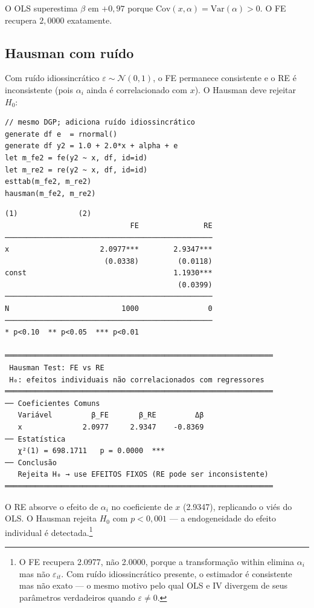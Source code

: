 O OLS superestima $\beta$ em $+0{,}97$ porque $\mathrm{Cov}(x,\alpha) =
\mathrm{Var}(\alpha) > 0$. O FE recupera $2{,}0000$ exatamente.

\subsection*{Hausman com ruído}

Com ruído idiossincrático $\varepsilon \sim \mathcal{N}(0,1)$, o FE permanece
consistente e o RE é inconsistente (pois $\alpha_i$ ainda é correlacionado
com $x$). O Hausman deve rejeitar $H_0$:

\begin{lstlisting}[caption={Hausman — FE vs RE com efeito correlacionado}]
// mesmo DGP; adiciona ruído idiossincrático
generate df e  = rnormal()
generate df y2 = 1.0 + 2.0*x + alpha + e
let m_fe2 = fe(y2 ~ x, df, id=id)
let m_re2 = re(y2 ~ x, df, id=id)
esttab(m_fe2, m_re2)
hausman(m_fe2, m_re2)
\end{lstlisting}

\begin{lstlisting}[language={}, basicstyle=\ttfamily\small,
  frame=none, numbers=none, backgroundcolor=\color{codbg},
  xleftmargin=0pt, xrightmargin=0pt, breaklines=false]
                            (1)              (2)
                             FE               RE
────────────────────────────────────────────────
x                     2.0977***        2.9347***
                       (0.0338)         (0.0118)
const                                  1.1930***
                                        (0.0399)
────────────────────────────────────────────────
N                          1000                0
────────────────────────────────────────────────
* p<0.10  ** p<0.05  *** p<0.01

══════════════════════════════════════════════════════════════
 Hausman Test: FE vs RE
 H₀: efeitos individuais não correlacionados com regressores
══════════════════════════════════════════════════════════════
── Coeficientes Comuns
   Variável         β_FE       β_RE         Δβ
   x              2.0977     2.9347    -0.8369
── Estatística
   χ²(1) = 698.1711   p = 0.0000  ***
── Conclusão
   Rejeita H₀ → use EFEITOS FIXOS (RE pode ser inconsistente)
══════════════════════════════════════════════════════════════
\end{lstlisting}

O RE absorve o efeito de $\alpha_i$ no coeficiente de $x$ (2.9347), replicando
o viés do OLS. O Hausman rejeita $H_0$ com $p < 0{,}001$ — a endogeneidade
do efeito individual é detectada.\footnote{%
  O FE recupera 2.0977, não 2.0000, porque a transformação within elimina
  $\alpha_i$ mas não $\varepsilon_{it}$. Com ruído idiossincrático presente,
  o estimador é consistente mas não exato — o mesmo motivo pelo qual OLS
  e IV divergem de seus parâmetros verdadeiros quando $\varepsilon \neq 0$.}

